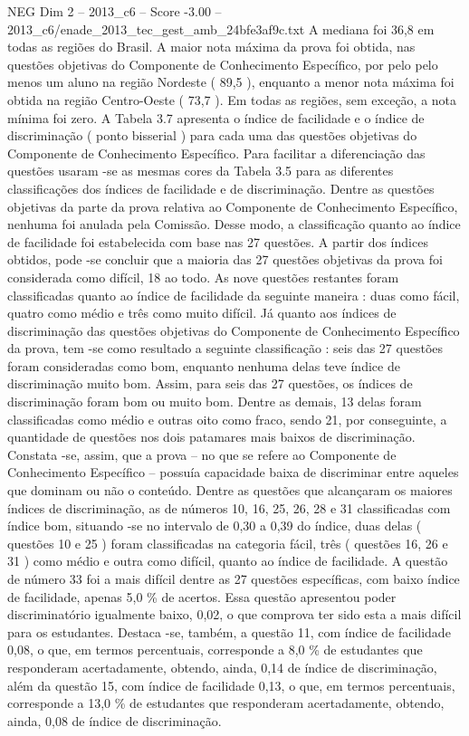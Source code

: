 \begin{textsample}{NEG Dim 2 – 2013\_c6 – Score -3.00 – 2013\_c6/enade\_2013\_tec\_gest\_amb\_24bfe3af9c.txt}
A mediana foi 36,8 em todas as regiões do Brasil.
A maior nota máxima da prova foi obtida, nas questões objetivas do Componente de Conhecimento Específico, por pelo pelo menos um aluno na região Nordeste ( 89,5 ), enquanto a menor nota máxima foi obtida na região Centro-Oeste ( 73,7 ).
Em todas as regiões, sem exceção, a nota mínima foi zero.
A Tabela 3.7 apresenta o índice de facilidade e o índice de discriminação ( ponto bisserial ) para cada uma das questões objetivas do Componente de Conhecimento Específico.
Para facilitar a diferenciação das questões usaram -se as mesmas cores da Tabela 3.5 para as diferentes classificações dos índices de facilidade e de discriminação.
Dentre as questões objetivas da parte da prova relativa ao Componente de Conhecimento Específico, nenhuma foi anulada pela Comissão.
Desse modo, a classificação quanto ao índice de facilidade foi estabelecida com base nas 27 questões.
A partir dos índices obtidos, pode -se concluir que a maioria das 27 questões objetivas da prova foi considerada como difícil, 18 ao todo.
As nove questões restantes foram classificadas quanto ao índice de facilidade da seguinte maneira : duas como fácil, quatro como médio e três como muito difícil.
Já quanto aos índices de discriminação das questões objetivas do Componente de Conhecimento Específico da prova, tem -se como resultado a seguinte classificação : seis das 27 questões foram consideradas como bom, enquanto nenhuma delas teve índice de discriminação muito bom.
Assim, para seis das 27 questões, os índices de discriminação foram bom ou muito bom.
Dentre as demais, 13 delas foram classificadas como médio e outras oito como fraco, sendo 21, por conseguinte, a quantidade de questões nos dois patamares mais baixos de discriminação.
Constata -se, assim, que a prova – no que se refere ao Componente de Conhecimento Específico – possuía capacidade baixa de discriminar entre aqueles que dominam ou não o conteúdo.
Dentre as questões que alcançaram os maiores índices de discriminação, as de números 10, 16, 25, 26, 28 e 31 classificadas com índice bom, situando -se no intervalo de 0,30 a 0,39 do índice, duas delas ( questões 10 e 25 ) foram classificadas na categoria fácil, três ( questões 16, 26 e 31 ) como médio e outra como difícil, quanto ao índice de facilidade.
A questão de número 33 foi a mais difícil dentre as 27 questões específicas, com baixo índice de facilidade, apenas 5,0 \% de acertos.
Essa questão apresentou poder discriminatório igualmente baixo, 0,02, o que comprova ter sido esta a mais difícil para os estudantes.
Destaca -se, também, a questão 11, com índice de facilidade 0,08, o que, em termos percentuais, corresponde a 8,0 \% de estudantes que responderam acertadamente, obtendo, ainda, 0,14 de índice de discriminação, além da questão 15, com índice de facilidade 0,13, o que, em termos percentuais, corresponde a 13,0 \% de estudantes que responderam acertadamente, obtendo, ainda, 0,08 de índice de discriminação.

\end{textsample}
